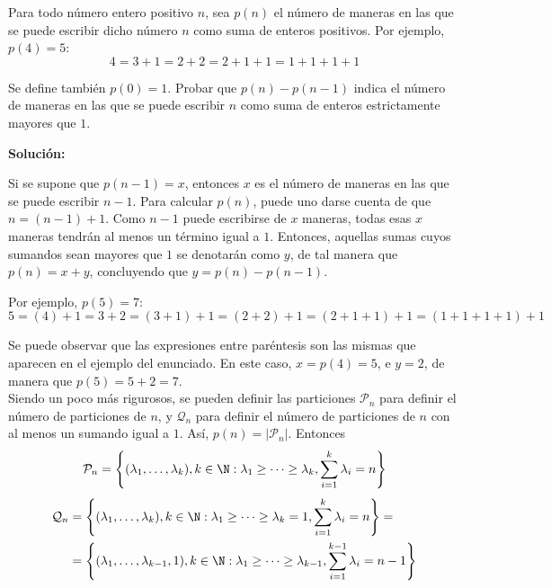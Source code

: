 \documentclass[../../main.tex]{subfiles}
\begin{document}
  \begin{shaded}
    Para todo número entero positivo $n$, sea $p(n)$ el número de maneras en las que se puede escribir dicho número $n$ como suma de enteros positivos. Por ejemplo, $p(4) = 5$:
    $$
    4 = 3 + 1 = 2 + 2 = 2 + 1 + 1 = 1 + 1 + 1 + 1
    $$

    Se define también $p(0) = 1$. Probar que $p(n) - p(n - 1)$ indica el número de maneras en las que se puede escribir $n$ como suma de enteros estrictamente mayores que $1$.
  \end{shaded}

  \textbf{Solución:}

  Si se supone que $p(n - 1) = x$, entonces $x$ es el número de maneras en las que se puede escribir $n - 1$. Para calcular $p(n)$, puede uno darse cuenta de que $n = (n - 1) + 1$. Como $n - 1$ puede escribirse de $x$ maneras, todas esas $x$ maneras tendrán al menos un término igual a $1$. Entonces, aquellas sumas cuyos sumandos sean mayores que $1$ se denotarán como $y$, de tal manera que $p(n) = x + y$, concluyendo que $y = p(n) - p(n - 1)$.

  Por ejemplo, $p(5) = 7$:
  $$
  5 = (4) + 1 = 3 + 2 = (3 + 1) + 1 = (2 + 2) + 1 = (2 + 1 + 1) + 1 = (1 + 1 + 1 + 1) + 1
  $$

  Se puede observar que las expresiones entre paréntesis son las mismas que aparecen en el ejemplo del enunciado. En este caso, $x = p(4) = 5$, e $y = 2$, de manera que $p(5) = 5 + 2 = 7$.\\

  Siendo un poco más rigurosos, se pueden definir las particiones $\mathcal{P}_n$ para definir el número de particiones de $n$, y $\mathcal{Q}_n$ para definir el número de particiones de $n$ con al menos un sumando igual a $1$. Así, $p(n) = |\mathcal{P}_n|$. Entonces
  $$
  \mathcal{P}_n = \left\{(\lambda_1, \dots, \lambda_k), k \in \N : \lambda_1 \geq \dots \geq \lambda_k, \sum_{i = 1}^k \lambda_i = n \right\}
  $$
  \begin{equation*}
    \begin{split}
      \mathcal{Q}_n & =
      \left\{(\lambda_1, \dots, \lambda_k), k \in \N : \lambda_1 \geq \dots \geq \lambda_k = 1, \sum_{i = 1}^k \lambda_i = n \right\} = \\ & =
      \left\{(\lambda_1, \dots, \lambda_{k - 1}, 1), k \in \N : \lambda_1 \geq \dots \geq \lambda_{k - 1}, \sum_{i = 1}^{k - 1} \lambda_i = n - 1 \right\}
    \end{split}
  \end{equation*}
\end{document}
